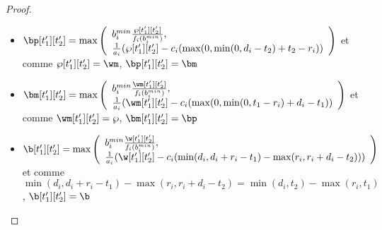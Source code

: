 \documentclass{report}
\newcommand{\bmin}{b_i^{min}}
\begin{document}
\begin{proof}~\\
\begin{itemize}
\item $
	\bp[t_1'][t_2']= \max
	\left(
	\begin{array}{l}
	\bmin\frac{\wp[t_1'][t_2']}{f_i(b_i^{min})},\\
	\frac{1}{a_i}(\wp[t_1'][t_2'] - c_i (\max(0,\min(0,d_i-t_2)+t_2-r_i))
	\end{array}
	\right)$
	 et comme $\wp[t_1'][t_2']=\wm$, $\bp[t_1'][t_2']=\bm$
	 \vspace{0.2cm}
	\item $
	\bm[t_1'][t_2']= \max
	\left(
	\begin{array}{l}
	\bmin\frac{\wm[t_1'][t_2']}{f_i(b_i^{min})},\\
	\frac{1}{a_i}(\wm[t_1'][t_2'] - c_i (\max(0,\min(0,t_1-r_i)+d_i-t_1))
	\end{array}
	\right)$
	 et comme $\wm[t_1'][t_2']=\wp$, $\bm[t_1'][t_2']=\bp$
	 \vspace{0.2cm}
	\item $
	\b[t_1'][t_2']= \max
	\left(
	\begin{array}{l}
	\bmin\frac{\w[t_1'][t_2']}{f_i(b_i^{min})},\\
	\frac{1}{a_i}(\w[t_1'][t_2'] - c_i (\min(d_i,d_i+r_i-t_1)-\max(r_i,r_i+d_i-t_2)))
	\end{array}
	\right)$
	et comme $\min(d_i,d_i+r_i-t_1)-\max(r_i,r_i+d_i-t_2)=\min(d_i,t_2)-\max(r_i,t_1)$, $\b[t_1'][t_2']=\b$

\end{itemize}
\end{proof}
\end{document}
